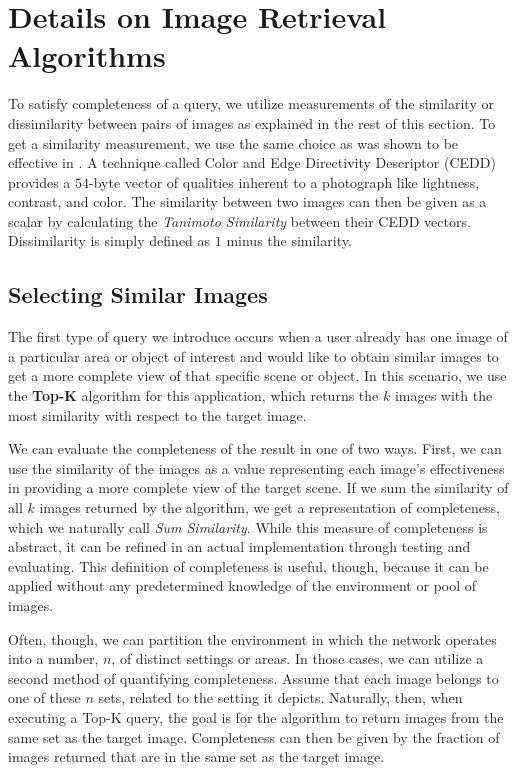 \appendices
\section{Details on Image Retrieval Algorithms}
\label{sec:image_retr_algs}

To satisfy completeness of a query, we utilize measurements of the similarity or dissimilarity between pairs of images as explained in the rest of this section.  To get a similarity measurement, we use the same choice as was shown to be effective in \cite{mediascope}.  A technique called Color and Edge Directivity Descriptor (CEDD) \cite{2008cedd} provides a $54$-byte vector of qualities inherent to a photograph like lightness, contrast, and color.  The similarity between two images can then be given as a scalar by calculating the \emph{Tanimoto Similarity} \cite{tanimoto} between their CEDD vectors.  Dissimilarity is simply defined as $1$ minus the similarity.

\subsection{Selecting Similar Images}
The first type of query we introduce occurs when a user already has one image of a particular area or object of interest and would like to obtain similar images to get a more complete view of that specific scene or object. In this scenario, we use the {\bf Top-K} algorithm for this application, which returns the $k$ images with the most similarity with respect to the target image. 

We can evaluate the completeness of the result in one of two ways.  First, we can use the similarity of the images as a value representing each image's effectiveness in providing a more complete view of the target scene.  If we sum the similarity of all $k$ images returned by the algorithm, we get a representation of completeness, which we naturally call \emph{Sum Similarity}.  While this measure of completeness is abstract, it can be refined in an actual implementation through testing and evaluating.  This definition of completeness is useful, though, because it can be applied without any predetermined knowledge of the environment or pool of images.  

Often, though, we can partition the environment in which the network operates into a number, $n$, of distinct settings or areas.  In those cases, we can utilize a second method of quantifying completeness.  Assume that each image belongs to one of these $n$ sets, %
related to the setting it depicts.  Naturally, then, when executing a Top-K query, the goal is for the algorithm to return images from the same set as the target image.  Completeness can then be given by the fraction of images returned that are in the same set as the target image.

